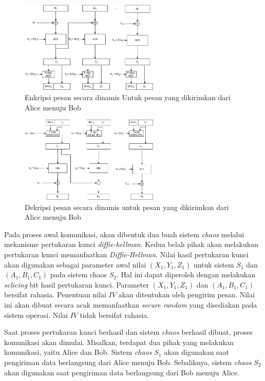 \begin{figure}[!h]
  \centering
  \includegraphics[width=250px]{chapters/res/chapter-3/img/encrypt.png}
  \caption{Enkripsi pesan secara dinamis Untuk pesan yang dikirimkan dari Alice menuju Bob} \label{fig:solution.encrypt}
\end{figure}

\begin{figure}[!h]
  \centering
  \includegraphics[width=250px]{chapters/res/chapter-3/img/decrypt.png}
  \caption{Dekripsi pesan secara dinamis untuk pesan yang dikirimkan dari Alice menuju Bob} \label{fig:solution.decrypt}
\end{figure}

Pada proses awal komunikasi, akan dibentuk dua buah sistem \emph{chaos} melalui mekanisme pertukaran kunci \emph{diffie-hellman}. Kedua belah pihak akan melakukan pertukaran kunci memanfaatkan \emph{Diffie-Hellman}. Nilai hasil pertukaran kunci akan digunakan sebagai parameter awal nilai $(X_1, Y_1, Z_1)$ untuk sistem $S_1$ dan $(A_1, B_1, C_1)$ pada sistem chaos $S_2$. Hal ini dapat diperoleh dengan melakukan \emph{sclicing} bit hasil pertukaran kunci. Parameter $(X_1, Y_1, Z_1)$ dan $(A_1, B_1, C_1)$ bersifat rahasia. Penentuan nilai $IV$ akan ditentukan oleh pengirim pesan. Nilai ini akan dibuat secara acak memanfaatkan \emph{secure random} yang disediakan pada sistem operasi. Nilai $IV$  tidak bersifat rahasia.

Saat proses pertukaran kunci berhasil dan sistem \emph{chaos} berhasil dibuat, proses komunikasi akan dimulai. Misalkan, terdapat dua pihak yang melakukan komunikasi, yaitu Alice dan Bob. Sistem \emph{chaos} $S_1$ akan digunakan saat pengiriman data berlangsung dari Alice menuju Bob.  Sebaliknya, sistem \emph{chaos} $S_2$ akan digunakan saat pengiriman data berlangsung dari Bob menuju Alice.

